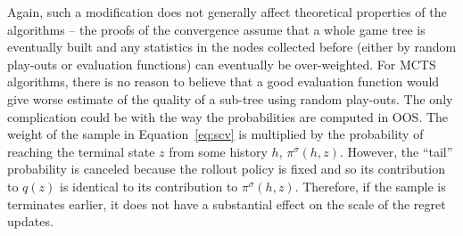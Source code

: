 Again, such a modification does not generally affect theoretical properties of the algorithms -- the proofs of the convergence assume that a whole game tree is eventually built and any statistics in the nodes collected before (either by random play-outs or evaluation functions) can eventually be over-weighted. For MCTS algorithms, there is no reason to believe that a good evaluation function would give worse estimate of the quality of a sub-tree using random play-outs.
The only complication could be with the way the probabilities are computed in OOS. The weight of the sample in Equation~\ref{eq:scv} is multiplied by the probability of reaching the terminal state $z$ from some history $h$, $\pi^\sigma(h,z)$. However, the ``tail'' probability is canceled because the rollout policy is fixed and so its contribution to $q(z)$ is identical to its contribution to $\pi^\sigma(h,z)$. Therefore, if the sample is terminates earlier, it does not have a substantial effect on the scale of the regret updates.



